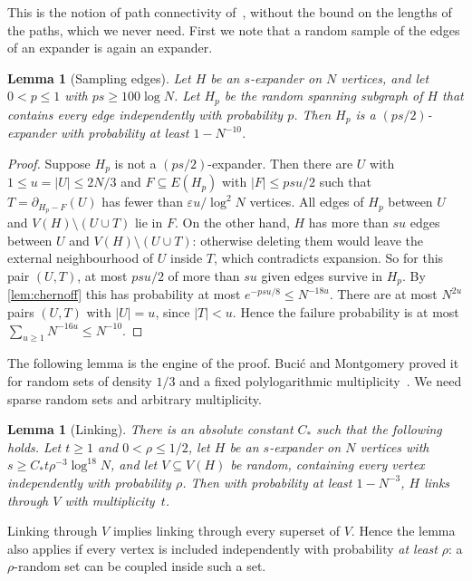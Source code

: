 \documentclass[11pt]{article}
\newtheorem{lemma}[theorem]{Lemma}
\theoremstyle{definition}
\theoremstyle{remark}
\numberwithin{equation}{section}
\numberwithin{figure}{section}
\numberwithin{table}{section}
\newcommand{\eps}{\varepsilon}
\newcommand{\NN}{\partial}
\begin{document}
This is the notion of path connectivity of~\cite[Definition~7]{BM}, without
the bound on the lengths of the paths, which we never need. First we note
that a random sample of the edges of an expander is again an expander.

\begin{lemma}[Sampling edges]\label{lem:sample}
Let $H$ be an $s$-expander on $N$ vertices, and let $0<p\le1$ with
$ps\ge100\log N$. Let $H_p$ be the random spanning subgraph of $H$ that
contains every edge independently with probability $p$. Then $H_p$ is a
$(ps/2)$-expander with probability at least $1-N^{-10}$.
\end{lemma}

\begin{proof}
Suppose $H_p$ is not a $(ps/2)$-expander. Then there are $U$ with
$1\le u=|U|\le2N/3$ and $F\subseteq E(H_p)$ with $|F|\le psu/2$ such that
$T=\NN_{H_p-F}(U)$ has fewer than $\eps u/\log^2N$ vertices. All edges of $H_p$
between $U$ and $V(H)\setminus(U\cup T)$ lie in $F$. On the other hand, $H$ has
more than $su$ edges between $U$ and $V(H)\setminus(U\cup T)$: otherwise
deleting them would leave the external neighbourhood of $U$ inside $T$, which
contradicts expansion. So for this pair $(U,T)$, at most $psu/2$ of more than
$su$ given edges survive in $H_p$. By \cref{lem:chernoff} this has probability
at most $e^{-psu/8}\le N^{-18u}$. There are at most $N^{2u}$ pairs $(U,T)$ with
$|U|=u$, since $|T|<u$. Hence the failure probability is at most
$\sum_{u\ge1}N^{-16u}\le N^{-10}$.
\end{proof}

The following lemma is the engine of the proof. Buci\'c and Montgomery proved it
for random sets of density $1/3$ and a fixed polylogarithmic
multiplicity~\cite[Theorem~16]{BM}. We need sparse random sets and arbitrary
multiplicity.

\begin{lemma}[Linking]\label{lem:link}
There is an absolute constant $C_*$ such that the following holds. Let $t\ge1$
and $0<\rho\le1/2$, let $H$ be an $s$-expander on $N$ vertices with
$s\ge C_*t\rho^{-3}\log^{18}N$, and let $V\subseteq V(H)$ be random, containing
every vertex independently with probability $\rho$. Then with probability at
least $1-N^{-3}$, $H$ links through $V$ with multiplicity~$t$.
\end{lemma}

Linking through $V$ implies linking through every superset of $V$. Hence the
lemma also applies if every vertex is included independently with probability
\emph{at least} $\rho$: a $\rho$-random set can be coupled inside such a set.
\end{document}
